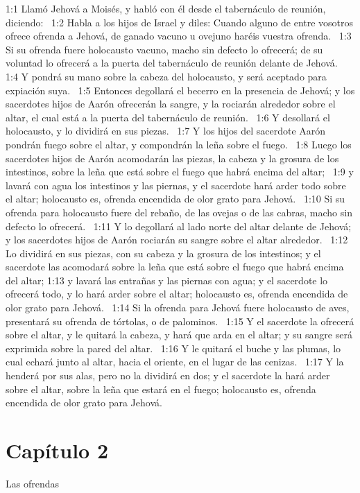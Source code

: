  
1:1 Llamó Jehová a Moisés, y habló con él desde el tabernáculo de reunión, diciendo:  
1:2 Habla a los hijos de Israel y diles: Cuando alguno de entre vosotros ofrece ofrenda a Jehová, de ganado vacuno u ovejuno haréis vuestra ofrenda.  
1:3 Si su ofrenda fuere holocausto vacuno, macho sin defecto lo ofrecerá; de su voluntad lo ofrecerá a la puerta del tabernáculo de reunión delante de Jehová.  
1:4 Y pondrá su mano sobre la cabeza del holocausto, y será aceptado para expiación suya.  
1:5 Entonces degollará el becerro en la presencia de Jehová; y los sacerdotes hijos de Aarón ofrecerán la sangre, y la rociarán alrededor sobre el altar, el cual está a la puerta del tabernáculo de reunión.  
1:6 Y desollará el holocausto, y lo dividirá en sus piezas.  
1:7 Y los hijos del sacerdote Aarón pondrán fuego sobre el altar, y compondrán la leña sobre el fuego.  
1:8 Luego los sacerdotes hijos de Aarón acomodarán las piezas, la cabeza y la grosura de los intestinos, sobre la leña que está sobre el fuego que habrá encima del altar;  
1:9 y lavará con agua los intestinos y las piernas, y el sacerdote hará arder todo sobre el altar; holocausto es, ofrenda encendida de olor grato para Jehová.  
1:10 Si su ofrenda para holocausto fuere del rebaño, de las ovejas o de las cabras, macho sin defecto lo ofrecerá.  
1:11 Y lo degollará al lado norte del altar delante de Jehová; y los sacerdotes hijos de Aarón rociarán su sangre sobre el altar alrededor.  
1:12 Lo dividirá en sus piezas, con su cabeza y la grosura de los intestinos; y el sacerdote las acomodará sobre la leña que está sobre el fuego que habrá encima del altar; 
1:13 y lavará las entrañas y las piernas con agua; y el sacerdote lo ofrecerá todo, y lo hará arder sobre el altar; holocausto es, ofrenda encendida de olor grato para Jehová.  
1:14 Si la ofrenda para Jehová fuere holocausto de aves, presentará su ofrenda de tórtolas, o de palominos.  
1:15 Y el sacerdote la ofrecerá sobre el altar, y le quitará la cabeza, y hará que arda en el altar; y su sangre será exprimida sobre la pared del altar.  
1:16 Y le quitará el buche y las plumas, lo cual echará junto al altar, hacia el oriente, en el lugar de las cenizas.  
1:17 Y la henderá por sus alas, pero no la dividirá en dos; y el sacerdote la hará arder sobre el altar, sobre la leña que estará en el fuego; holocausto es, ofrenda encendida de olor grato para Jehová.  
\section*{Capítulo 2}
Las ofrendas 

